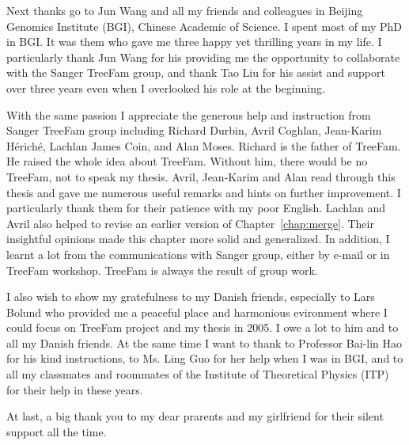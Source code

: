 Next thanks go to Jun Wang and all my friends and colleagues in Beijing Genomics Institute (BGI), Chinese Academic of Science.
I spent most of my PhD in BGI. It was them who gave me three happy yet thrilling years in my life.
I particularly thank Jun Wang for his providing me the opportunity to collaborate with the Sanger TreeFam group,
and thank Tao Liu for his assist and support over three years even when I overlooked his role at the beginning.

With the same passion I appreciate the generous help and instruction from Sanger TreeFam group including
Richard Durbin, Avril Coghlan, Jean-Karim H\'{e}rich\'{e}, Lachlan James Coin, and Alan Moses. Richard is the father
of TreeFam. He raised the whole idea about TreeFam. Without him, there would be no TreeFam, not to speak my thesis.
Avril, Jean-Karim and Alan
read through this thesis and gave me numerous useful remarks and hints on further improvement. I particularly thank them
for their patience with my poor English. Lachlan and Avril also helped to revise an earlier version of
Chapter~\ref{chap:merge}. Their insightful opinions made this chapter more solid and generalized.
In addition, I learnt a lot from the communications with Sanger group, either by e-mail or in TreeFam workshop.
TreeFam is always the result of group work.

I also wish to show my gratefulness to my Danish friends, especially to Lars Bolund who provided me
a peaceful place and harmonious evironment where I could focus on TreeFam project and my thesis in 2005.
I owe a lot to him and to all my Danish friends. At the same time I want to thank to
Professor Bai-lin Hao for his kind instructions, to Ms. Ling Guo for her help when I was
in BGI, and to all my classmates and roommates of the Institute of Theoretical Physics
(ITP) for their help in these years.

At last, a big thank you to my dear prarents and my girlfriend for their silent support all the time.

\tableofcontents
{}
\listoffigures
\listoftables







\appendix





\printindex


